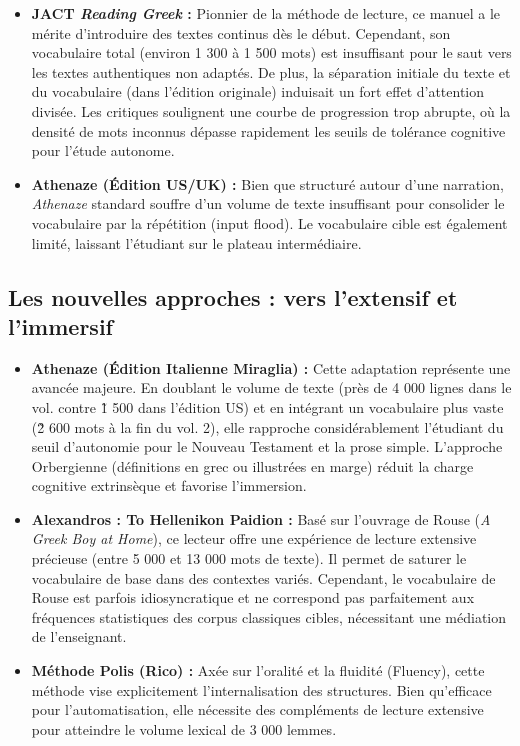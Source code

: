 {{\begin{itemize}\item \textbf{JACT \textit{Reading Greek} :} Pionnier de la méthode de lecture, ce manuel a le mérite d'introduire des textes continus dès le début. Cependant, son vocabulaire total (environ 1 300 à 1 500 mots) est insuffisant pour le saut vers les textes authentiques non adaptés.\cite{III-1-2-ref36} De plus, la séparation initiale du texte et du vocabulaire (dans l'édition originale) induisait un fort effet d'attention divisée.\cite{III-1-2-ref38} Les critiques soulignent une courbe de progression trop abrupte, où la densité de mots inconnus dépasse rapidement les seuils de tolérance cognitive pour l'étude autonome.\cite{III-1-2-ref38}\item \textbf{Athenaze (Édition US/UK) :} Bien que structuré autour d'une narration, \textit{Athenaze} standard souffre d'un volume de texte insuffisant pour consolider le vocabulaire par la répétition (input flood). Le vocabulaire cible est également limité, laissant l'étudiant sur le \og plateau intermédiaire\fg{}.\cite{III-1-2-ref40}\end{itemize}

\subsection{Les nouvelles approches : vers l'extensif et l'immersif}

\begin{itemize}\item \textbf{Athenaze (Édition Italienne \- Miraglia) :} Cette adaptation représente une avancée majeure. En doublant le volume de texte (près de 4 000 lignes dans le vol.\cite{III-1-2-ref1} contre \~1 500 dans l'édition US) et en intégrant un vocabulaire plus vaste (\~2 600 mots à la fin du vol. 2), elle rapproche considérablement l'étudiant du seuil d'autonomie pour le Nouveau Testament et la prose simple.\cite{III-1-2-ref30} L'approche \og Orbergienne\fg{} (définitions en grec ou illustrées en marge) réduit la charge cognitive extrinsèque et favorise l'immersion.\item \textbf{Alexandros : To Hellenikon Paidion :} Basé sur l'ouvrage de Rouse (\textit{A Greek Boy at Home}), ce lecteur offre une expérience de lecture extensive précieuse (entre 5 000 et 13 000 mots de texte).\cite{III-1-2-ref43} Il permet de saturer le vocabulaire de base dans des contextes variés. Cependant, le vocabulaire de Rouse est parfois idiosyncratique et ne correspond pas parfaitement aux fréquences statistiques des corpus classiques cibles, nécessitant une médiation de l'enseignant.\cite{III-1-2-ref45}\item \textbf{Méthode Polis (Rico) :} Axée sur l'oralité et la fluidité (Fluency), cette méthode vise explicitement l'internalisation des structures. Bien qu'efficace pour l'automatisation, elle nécessite des compléments de lecture extensive pour atteindre le volume lexical de 3 000 lemmes.\cite{III-1-2-ref46}\end{itemize}

}}
